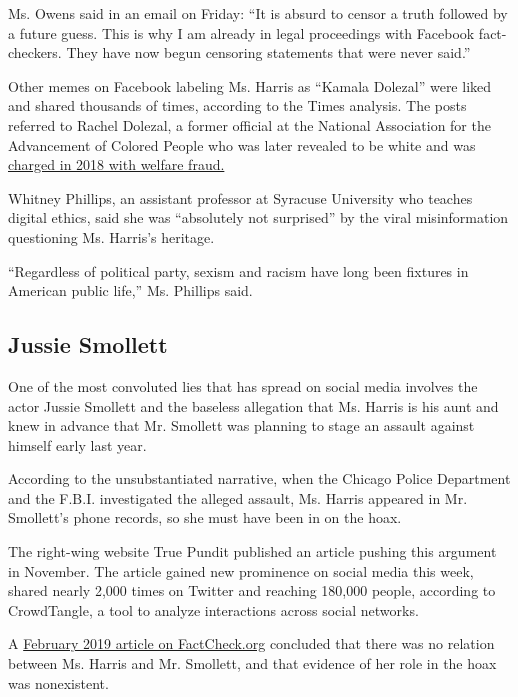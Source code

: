 Ms. Owens said in an email on Friday: ``It is absurd to censor a truth
followed by a future guess. This is why I am already in legal
proceedings with Facebook fact-checkers. They have now begun censoring
statements that were never said.''

Other memes on Facebook labeling Ms. Harris as ``Kamala Dolezal'' were
liked and shared thousands of times, according to the Times analysis.
The posts referred to Rachel Dolezal, a former official at the National
Association for the Advancement of Colored People who was later revealed
to be white and was
\href{https://www.nytimes3xbfgragh.onion/2018/05/25/us/rachel-dolezal-welfare-fraud.html}{charged
in 2018 with welfare fraud.}

Whitney Phillips, an assistant professor at Syracuse University who
teaches digital ethics, said she was ``absolutely not surprised'' by the
viral misinformation questioning Ms. Harris's heritage.

``Regardless of political party, sexism and racism have long been
fixtures in American public life,'' Ms. Phillips said.

\hypertarget{jussie-smollett}{%
\subsection{Jussie Smollett}\label{jussie-smollett}}

One of the most convoluted lies that has spread on social media involves
the actor Jussie Smollett and the baseless allegation that Ms. Harris is
his aunt and knew in advance that Mr. Smollett was planning to stage an
assault against himself early last year.

According to the unsubstantiated narrative, when the Chicago Police
Department and the F.B.I. investigated the alleged assault, Ms. Harris
appeared in Mr. Smollett's phone records, so she must have been in on
the hoax.

The right-wing website True Pundit published an article pushing this
argument in November. The article gained new prominence on social media
this week, shared nearly 2,000 times on Twitter and reaching 180,000
people, according to CrowdTangle, a tool to analyze interactions across
social networks.

A
\href{https://www.factcheck.org/2019/02/no-evidence-sen-harris-smollett-are-related/}{February
2019 article on FactCheck.org} concluded that there was no relation
between Ms. Harris and Mr. Smollett, and that evidence of her role in
the hoax was nonexistent.

